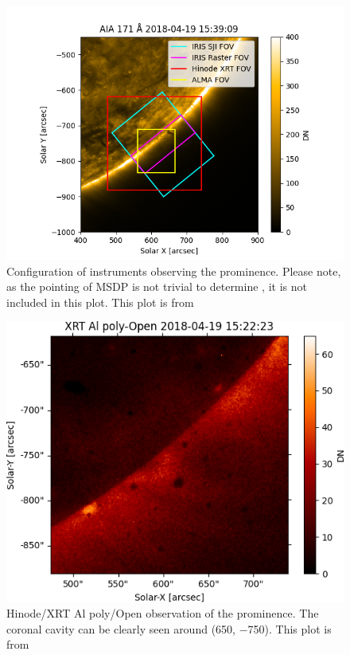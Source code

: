 \begin{figure}
    \centering
    \includegraphics[width=0.93\linewidth]{./01Observations/figs/20180419/Figure_1.png}
    \caption[Configuration of instruments observing the prominence.]{Configuration of instruments observing the prominence. Please note, as the pointing of MSDP is not trivial to determine \citep{barczynski_spectro-imagery_2021}, it is not included in this plot. This plot is from \cite{peat_solar_2021}}
    \label{config}
\end{figure}
 
\begin{figure}
    \centering 
    \includegraphics[width=0.6\linewidth]{./01Observations/figs/20180419/xrt.png}
    \caption[Hinode/XRT Al poly/Open observation of the prominence.]{Hinode/XRT Al poly/Open observation of the prominence. The coronal cavity can be clearly seen around (650\arcsec, $-$750\arcsec). This plot is from \cite{peat_solar_2021}}
    \label{xrt}
\end{figure}

